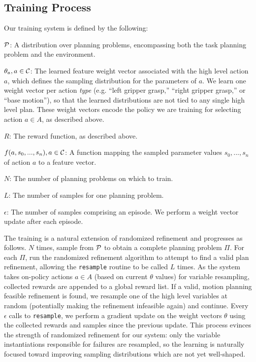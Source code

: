 \subsection{Training Process}
Our training system is defined by the following:
\begin{tightlist}
\item[$\mathcal{P}$:] A distribution over planning problems, encompassing both
the task planning problem and the environment.
\item[$\theta_{a}, a \in \mathcal{C}$:] The learned feature weight vector associated with the high
level action $a$, which defines the sampling distribution for the
parameters of $a$. We learn one
weight vector per action \emph{type} (e.g. ``left gripper grasp,'' ``right
gripper grasp,'' or ``base motion''), so that the learned distributions are
not tied to any single high level plan. These weight vectors encode the policy
we are training for selecting action $a \in A$, as described above.
\item[$R$:] The reward function, as described above.
\item[$f(a, s_{0}, ..., s_{n}), a \in \mathcal{C}$:] A function mapping the sampled
parameter values $s_{0}, ..., s_{n}$ of action $a$ to a feature vector.
\item[$N$:] The number of planning problems on which to train.
\item[$L$:] The number of samples for one planning problem.
\item[$\epsilon$:] The number of samples comprising an episode. We perform
a weight vector update after each episode.
\end{tightlist}

The training is a natural extension of randomized
refinement and progresses as follows. $N$ times, sample from $\mathcal{P}$ to obtain
a complete planning problem $\Pi$. For each $\Pi$, run the randomized refinement
algorithm to attempt to find a valid plan refinement, allowing the \texttt{resample}
routine to be called $L$ times. As the system takes on-policy actions $a \in A$ (based on
current $\theta$ values) for variable resampling, collected
rewards are appended to a global reward list. If a valid, motion planning
feasible refinement is found, we resample one of
the high level variables at random (potentially making the refinement infeasible again)
and continue. Every $\epsilon$ calls to
\texttt{resample}, we perform a gradient update on the weight vectors $\theta$ using the
collected rewards and samples since the previous update. This process
evinces the strength of randomized refinement for our system: only the variable
instantiations responsible for failures are resampled, so the learning is naturally
focused toward improving sampling distributions which are not yet well-shaped.

